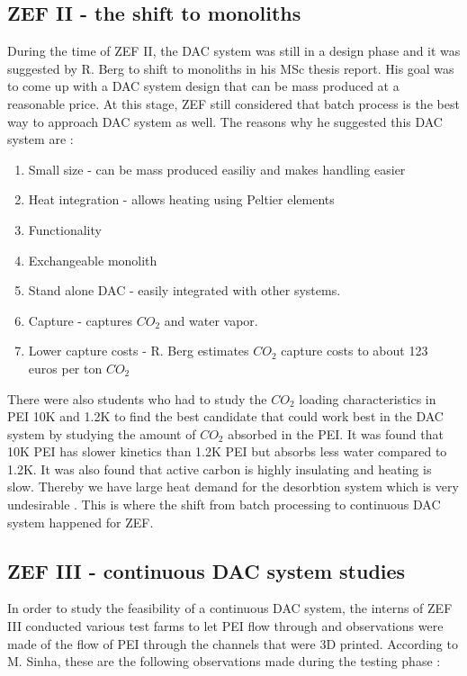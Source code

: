 \subsection{ZEF II - the shift to monoliths}

During the time of ZEF II, the DAC system was still in a design phase and it was suggested by R. Berg to shift to monoliths in his MSc thesis report. His goal was to come up with a DAC system design that can be mass produced at a reasonable price. At this stage, ZEF still considered that batch process is the best way to approach DAC system as well. The reasons why he suggested this DAC system are \cite{Berg2018}: 
\begin{enumerate}
    \item Small size - can be mass produced easiliy and makes handling easier 
    \item Heat integration - allows heating using Peltier elements
    \item Functionality
    \item Exchangeable monolith
    \item Stand alone DAC - easily integrated with other systems. 
    \item Capture - captures $CO_2$ and water vapor. 
    \item Lower capture costs - R. Berg estimates $CO_2$ capture costs to about 123 euros per ton $CO_2$
\end{enumerate}

There were also students who had to study the $CO_2$ loading characteristics in PEI 10K and 1.2K to find the best candidate that could work best in the DAC system by studying the amount of $CO_2$ absorbed in the PEI. It was found that 10K PEI has slower kinetics than 1.2K PEI but absorbs less water compared to 1.2K. It was also found that active carbon is highly insulating and heating is slow. Thereby we have large heat demand for the desorbtion system which is very undesirable \cite{Laake2018}. This is where the shift from batch processing to continuous DAC system happened for ZEF. 


\subsection{ZEF III - continuous DAC system studies}

In order to study the feasibility of a continuous DAC system, the interns of ZEF III conducted various test farms to let PEI flow through and observations were made of the flow of PEI through the channels that were 3D printed. According to M. Sinha, these are the following observations made during the testing phase \cite{Sinha2018} : 

